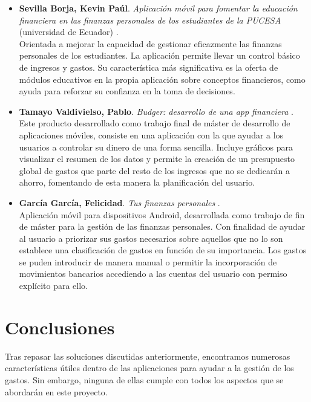 \begin{itemize}
    \item \textbf{Sevilla Borja, Kevin Paúl}. 
    \textit{Aplicación móvil para fomentar la educación financiera en las finanzas personales 
    de los estudiantes de la PUCESA} (universidad de Ecuador) \cite{sevilla2024aplicacion}. \\
    Orientada a mejorar la capacidad
    de gestionar eficazmente las finanzas personales de los estudiantes. La aplicación 
    permite llevar un control básico de ingresos y gastos. Su característica más significativa 
    es la oferta de módulos educativos en la propia aplicación sobre conceptos financieros, como 
    ayuda para reforzar su confianza en la toma de decisiones.

    \item \textbf{Tamayo Valdivielso, Pablo}. 
    \textit{Budger: desarrollo de una app financiera} \cite{tamayo2022aplicacion}. \\ 
    Este producto desarrollado como 
    trabajo final de máster de desarrollo de aplicaciones móviles, consiste en una aplicación 
    con la que ayudar a los usuarios a controlar su dinero de una forma sencilla. Incluye 
    gráficos para visualizar el resumen de los datos y 
    permite la creación de un presupuesto global de gastos que parte del resto de los ingresos 
    que no se dedicarán a ahorro, fomentando de esta manera la planificación del usuario.

    \item \textbf{García García, Felicidad}. 
    \textit{Tus finanzas personales} \cite{garcia2019aplicacion}. \\  
    Aplicación móvil para dispositivos Android, 
    desarrollada como trabajo de fin de máster para la gestión de las finanzas personales. 
    Con finalidad de ayudar al usuario a priorizar sus gastos necesarios sobre aquellos
    que no lo son establece una clasificación de gastos en función de su importancia. 
    Los gastos se puden introducir de manera manual o permitir la incorporación de 
    movimientos bancarios accediendo a las cuentas del usuario con permiso explícito para ello.
    
\end{itemize}

\section{Conclusiones}
Tras repasar las soluciones discutidas anteriormente, encontramos numerosas 
características útiles dentro de las aplicaciones para ayudar a la gestión 
de los gastos. Sin embargo, ninguna de ellas cumple con todos los aspectos que 
se abordarán en este proyecto.

